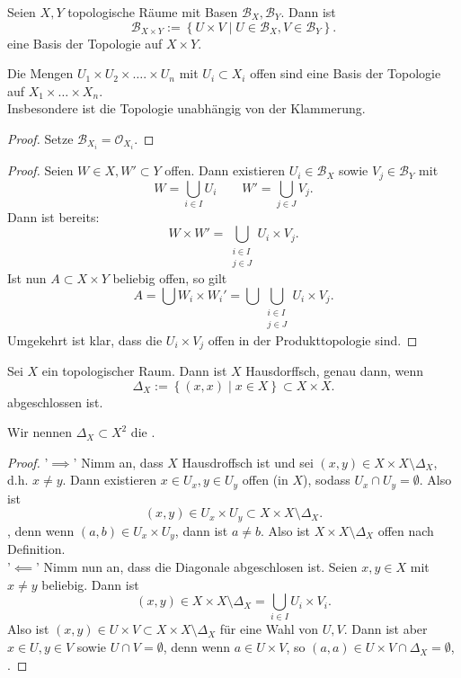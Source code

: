 \begin{lemma}
    Seien $X,Y$ topologische Räume mit Basen  $\mathcal{B}_X, \mathcal{B}_Y$. Dann ist
    \[
    \mathcal{B}_{X\times Y} := \left \{U\times V \mid  U\in \mathcal{B}_X, V\in \mathcal{B}_Y\right\} 
    .\] 
    eine Basis der Topologie auf $X\times Y$.
\end{lemma}
\begin{corollary}
    Die Mengen $U_1\times U_2\times \ldots.\times U_n$ mit $U_i\subset X_i$ offen sind eine Basis der Topologie auf $X_1\times \ldots\times X_n$. \\
    Insbesondere ist die Topologie unabhängig von der Klammerung.
\end{corollary}
\begin{proof}
    Setze $\mathcal{B}_{X_i} = \mathcal{O}_{X_i}$.
\end{proof}
\begin{proof}
    Seien $W\in X, W'\subset Y$ offen. Dann existieren $U_i \in \mathcal{B}_X$ sowie $V_j \in \mathcal{B}_Y$ mit
    \[
    W = \bigcup_{i \in  I} U_i \qquad W' = \bigcup_{j\in J} V_j 
    .\] 
    Dann ist bereits:
    \[
    W \times W' = \bigcup_{\substack{i\in I \\j\in J} } U_i \times V_j
    .\] 
    Ist nun $A\subset X\times Y$ beliebig offen, so gilt
    \[
    A = \bigcup W_i \times W_i' = \bigcup  \bigcup_{\substack{i\in I\\j\in J}  } U_i \times V_j
    .\] 
    Umgekehrt ist klar, dass die $U_i\times V_j$ offen in der Produkttopologie sind.
\end{proof}
\begin{theorem}
    Sei $X$ ein topologischer Raum. Dann ist  $X$ Hausdorffsch, genau dann, wenn
     \[
         \Delta_X := \left \{(x,x) \mid  x\in X\right\}  \subset X\times X
    .\] 
    abgeschlossen ist.
\end{theorem}
\begin{notation}
    Wir nennen $\Delta_X\subset X^2$  die .
\end{notation}
\begin{proof}
'$\implies$' Nimm an, dass $X$ Hausdroffsch ist und sei  $(x,y) \in X \times X \setminus \Delta_X$, d.h. $x\neq y$. Dann existieren $x\in U_x,y\in U_y$ offen (in $X$), sodass  $U_x \cap  U_y = \emptyset$. Also ist
    \[
        (x,y)\in     U_x\times U_y \subset X\times X \setminus \Delta_X
    .\] 
    , denn wenn $(a,b) \in U_x \times U_y$, dann ist $a\neq b$. Also ist  $X\times X \setminus \Delta_X$ offen nach Definition. \\
    '$\impliedby$'    Nimm nun an, dass die Diagonale abgeschlosen ist. Seien $x,y\in X$ mit $x\neq y$ beliebig. Dann ist
    \[
        (x,y) \in X\times X \setminus \Delta_X = \bigcup_{i\in I} U_i \times V_i 
    .\] 
    Also ist $(x,y) \in U\times V \subset X\times X\setminus \Delta_X$ für eine Wahl von $U,V$. Dann ist aber  $x\in U, y\in V$ sowie $U\cap V = \emptyset$, denn wenn $a\in U\times V$, so $(a,a) \in U\times V \cap  \Delta_X = \emptyset$, \contra.
\end{proof}
